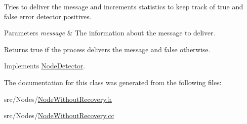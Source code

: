 Tries to deliver the message and increments statistics to keep track of true and false error detector positives. 


\begin{DoxyParams}{Parameters}
{\em message} & The information about the message to deliver. \\
\hline
\end{DoxyParams}
\begin{DoxyReturn}{Returns}
true if the process delivers the message and false otherwise. 
\end{DoxyReturn}


Implements \hyperlink{class_node_detector_a51e7dccd54e94bbe937752ca39dfdba4}{Node\+Detector}.



The documentation for this class was generated from the following files\+:\begin{DoxyCompactItemize}
\item 
src/\+Nodes/\hyperlink{_node_without_recovery_8h}{Node\+Without\+Recovery.\+h}\item 
src/\+Nodes/\hyperlink{_node_without_recovery_8cc}{Node\+Without\+Recovery.\+cc}\end{DoxyCompactItemize}
